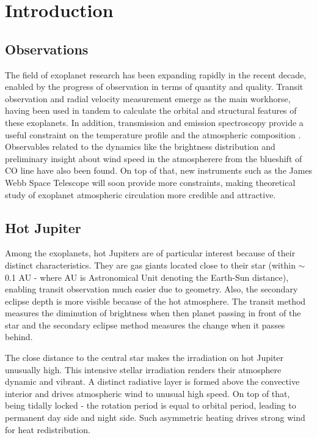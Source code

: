\documentclass[11pt]{article}
\begin{document}



\section{Introduction}


\subsection{Observations}
  

The field of exoplanet research has been expanding rapidly in the recent decade, enabled by the progress of observation in terms of quantity and quality. Transit observation and radial velocity measurement emerge as the main workhorse, having been used in tandem to calculate the orbital and structural features of these exoplanets. In addition, transmission and emission spectroscopy provide a useful constraint on the temperature profile and the atmospheric composition  \citep{HengShowman2015}. Observables related to the dynamics like the brightness distribution \citep{knutson2007map} and preliminary insight about wind speed in the atmospherere from the blueshift of CO line \citep{snellen2010orbital} have also been found. On top of that, new instruments such as the James Webb Space Telescope will soon provide more constraints, making theoretical study of exoplanet atmospheric circulation more credible and attractive. 

\subsection{Hot Jupiter}

Among the exoplanets, hot Jupiters are of particular interest because of their distinct characteristics. They are gas giants located close to their star (within $\sim$ 0.1 AU - where AU is Astronomical Unit denoting the Earth-Sun distance), enabling transit observation much easier due to geometry. Also, the secondary eclipse depth is more visible because of the hot atmosphere.  The transit method measures the diminution of brightness when then planet passing in front of the star and the secondary eclipse method measures the change when it passes behind.

The close distance to the central star makes the irradiation on hot Jupiter unusually high. This intensive stellar irradiation renders their atmosphere dynamic and vibrant. A distinct radiative layer is formed above the convective interior and drives atmospheric wind to unusual high speed. On top of that, being tidally locked - the rotation period is equal to orbital period, leading to permanent day side and night side. Such asymmetric heating drives strong wind for heat redistribution. 
\end{document}
